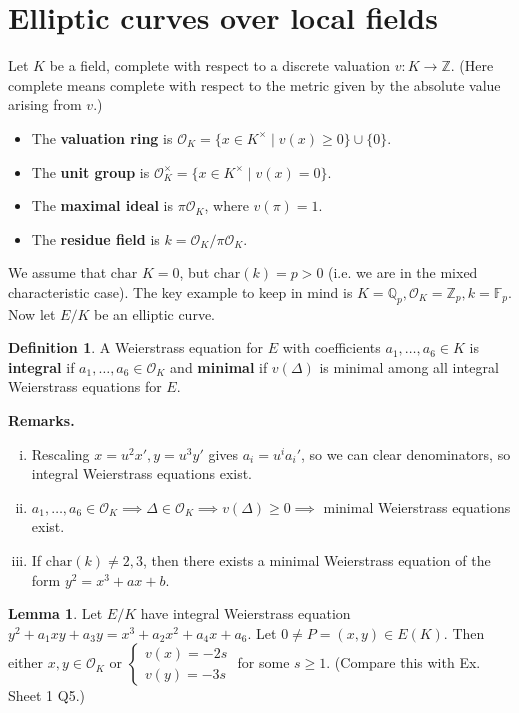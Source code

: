 \documentclass{article}
\theoremstyle{definition}
\newtheorem{lemma}[theorem]{Lemma}
\newtheorem{defn}{Definition}[section]
\begin{document}
\section{Elliptic curves over local fields}
Let $K$ be a field, complete with respect to a discrete valuation $v : K \to \mathbb{Z}$. (Here complete means complete with respect to the metric given by the absolute value arising from $v$.)
\begin{itemize}
    \item The \textbf{valuation ring} is $\mathcal{O}_K = \{x \in K^\times \mid v(x)\ge 0\} \cup \{0\}$.
    \item The \textbf{unit group} is $\mathcal{O}_K^\times = \{x \in K^\times \mid  v(x) = 0\}$.
    \item The \textbf{maximal ideal} is $\pi \mathcal{O}_K$, where $v(\pi)=1$.
    \item The \textbf{residue field} is $k = \mathcal{O}_K/\pi \mathcal{O}_K$.
\end{itemize}
We assume that $\text{char }K = 0$, but $\text{char}(k) = p >0$ (i.e. we are in the mixed characteristic case). The key example to keep in mind is $K = \mathbb{Q}_p, \mathcal{O}_K = \mathbb{Z}_p, k = \mathbb{F}_p$. Now let $E/K$ be an elliptic curve.
\begin{defn}
    A Weierstrass equation for $E$ with coefficients $a_1,\ldots,a_6 \in K$ is \textbf{integral} if $a_1,\ldots,a_6 \in \mathcal{O}_K$ and \textbf{minimal} if $v(\Delta)$ is minimal among all integral Weierstrass equations for $E$.
\end{defn}
\textbf{Remarks.}
\begin{enumerate}[(i)]
    \item Rescaling $x = u^2x', y= u^3y'$ gives $a_i = u^i a_i'$, so we can clear denominators, so integral Weierstrass equations exist.
    \item $a_1,\ldots,a_6 \in \mathcal{O}_K \implies \Delta \in \mathcal{O}_K \implies v(\Delta)\ge 0 \implies $ minimal Weierstrass equations exist.
    \item If $\text{char}(k) \neq 2,3$, then there exists a minimal Weierstrass equation of the form $y^2 = x^3+ax+b$.
\end{enumerate} 
\begin{lemma}\label{lemma9.1}
    Let $E/K$ have integral Weierstrass equation $y^2+a_1xy+a_3y = x^3+a_2x^2+a_4x+a_6$. Let $0 \neq P = (x,y) \in E(K)$. Then either $x,y \in \mathcal{O}_K$ or $\begin{cases}
        v(x) = -2s\\
        v(y) = -3s
    \end{cases}$
    for some $s\ge 1$. (Compare this with Ex. Sheet 1 Q5.)
\end{lemma}
\end{document}
